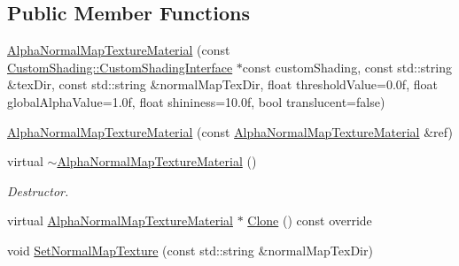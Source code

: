 \subsection*{Public Member Functions}
\begin{DoxyCompactItemize}
\item 
\mbox{\hyperlink{class_geometry_engine_1_1_geometry_material_1_1_alpha_normal_map_texture_material_ae09aba3281b21c239ad7c7391859b510}{Alpha\+Normal\+Map\+Texture\+Material}} (const \mbox{\hyperlink{class_geometry_engine_1_1_custom_shading_1_1_custom_shading_interface}{Custom\+Shading\+::\+Custom\+Shading\+Interface}} $\ast$const custom\+Shading, const std\+::string \&tex\+Dir, const std\+::string \&normal\+Map\+Tex\+Dir, float threshold\+Value=0.\+0f, float global\+Alpha\+Value=1.\+0f, float shininess=10.\+0f, bool translucent=false)
\item 
\mbox{\hyperlink{class_geometry_engine_1_1_geometry_material_1_1_alpha_normal_map_texture_material_acc0c412a7f227444958bf1249eedb34d}{Alpha\+Normal\+Map\+Texture\+Material}} (const \mbox{\hyperlink{class_geometry_engine_1_1_geometry_material_1_1_alpha_normal_map_texture_material}{Alpha\+Normal\+Map\+Texture\+Material}} \&ref)
\item 
\mbox{\label{class_geometry_engine_1_1_geometry_material_1_1_alpha_normal_map_texture_material_a2148df342bc4b1907ca404970d0593cd}} 
virtual \mbox{\hyperlink{class_geometry_engine_1_1_geometry_material_1_1_alpha_normal_map_texture_material_a2148df342bc4b1907ca404970d0593cd}{$\sim$\+Alpha\+Normal\+Map\+Texture\+Material}} ()
\begin{DoxyCompactList}\small\item\em Destructor. \end{DoxyCompactList}\item 
virtual \mbox{\hyperlink{class_geometry_engine_1_1_geometry_material_1_1_alpha_normal_map_texture_material}{Alpha\+Normal\+Map\+Texture\+Material}} $\ast$ \mbox{\hyperlink{class_geometry_engine_1_1_geometry_material_1_1_alpha_normal_map_texture_material_a4dff732a06c94a7761a054ca62dbd491}{Clone}} () const override
\item 
void \mbox{\hyperlink{class_geometry_engine_1_1_geometry_material_1_1_alpha_normal_map_texture_material_a188ebcb934a89af6c130a0a787aa1c1e}{Set\+Normal\+Map\+Texture}} (const std\+::string \&normal\+Map\+Tex\+Dir)
\item 
\mbox{\label{class_geometry_engine_1_1_geometry_material_1_1_alpha_normal_map_texture_material_a49dd763e0d239fed2ddaf389de36a692}} 

\end{DoxyCompactItemize}
